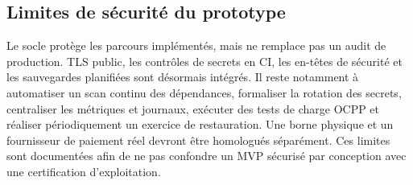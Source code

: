 \subsection{Limites de sécurité du prototype}

Le socle protège les parcours implémentés, mais ne remplace pas un audit de
production. TLS public, les contrôles de secrets en CI, les en-têtes de sécurité
et les sauvegardes planifiées sont désormais intégrés. Il reste notamment à
automatiser un scan continu des dépendances, formaliser la rotation des secrets,
centraliser les métriques et journaux, exécuter des tests de charge OCPP et
réaliser périodiquement un exercice de restauration.
Une borne physique et un fournisseur de paiement réel devront être homologués
séparément. Ces limites sont documentées afin de ne pas confondre un MVP sécurisé
par conception avec une certification d'exploitation.
